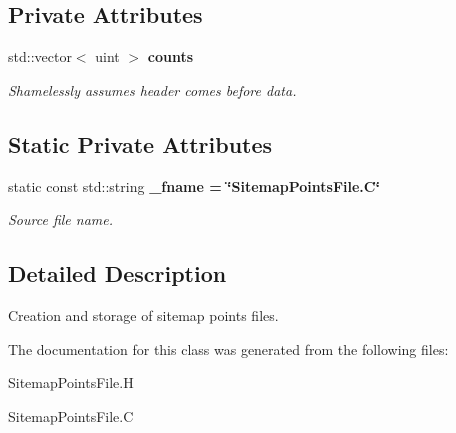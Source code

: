 \subsection*{Private Attributes}
\begin{CompactItemize}
\item 
std::vector$<$ uint $>$ \bf{counts}\label{classSimSite3D_1_1SitemapPointsFile_b3c2f62fc9252fb70d4287d889c7b9fa}

\begin{CompactList}\small\item\em Shamelessly assumes header comes before data. \item\end{CompactList}\end{CompactItemize}
\subsection*{Static Private Attributes}
\begin{CompactItemize}
\item 
static const std::string \bf{\_\-fname} = \char`\"{}Sitemap\-Points\-File.C\char`\"{}\label{classSimSite3D_1_1SitemapPointsFile_3c2df5c3e3de9995d61644c28d181c42}

\begin{CompactList}\small\item\em Source file name. \item\end{CompactList}\end{CompactItemize}


\subsection{Detailed Description}
Creation and storage of sitemap points files. 



The documentation for this class was generated from the following files:\begin{CompactItemize}
\item 
Sitemap\-Points\-File.H\item 
Sitemap\-Points\-File.C\end{CompactItemize}
